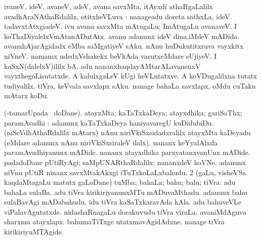 \noindent
\gl{\pagu}
\expl{}
 ivaneV, ideV, avaneV, adeV, avana savxMta, itAyxdi athaRgaLalilx avadhAraNAthaRdalilx, otitxheVLuva \parx :  nanageadu doreta sathxLa, ideV.  tadavxtAtxgiadeV.  ivu avana savxMta mAtugaLu; ImAtugaLu avanaveV.  I koThaDiyalelxVmAtanADutAtx.  avanu adanunx ideV dina,iMdeV mADida.  avanuhAjarAgidadx eMba saMgatiyeV sAku.  nAnu huDukutitxruva vayxkitx niVneV.  namamx udedxVshakekx beVkAda vasutxeMdare sUjiyeV.  I kaSxN(dalelxV)ililx bA.  adu nananxhaqdayAMtarALavanenxV vayxthegoLisutatxde.  A kalulxgaLeV kUgi heVLutatxve.  A koVDugalilxna tutatx tudiyalilx.  tiVra, keVvala savxlapx sAku. nanage bahaLa savxlapx, oMdu cuTaku mAtarx koDu. \eentry

\bentry
{} 
\gl{\kirxvi}
\expl{}
\bmng
\bnum
{} (-tamarUpada \gu\ doDane). 
\banum
{} atayxMta; kaTaTxkaDeya; atayxdhika; gariSaThx; paramAvadhi :  adanunx kaTaTxkaDeya haniyavaregU kuDidubiDu.  (niSeVdhAthaRdalilx mAtarx) nAnu niriVkiSxsidadxralilx atayxMta kaDeyadu (eMdare adanunx nAnu niriVkiSxsiraleV ilalx).  nananx keYyalAlxda paramAvadhiyanunx mADide.  nananx atayxdhika parxyatanxvanUnx mADide. 
  padadoDane pUtiRyAgi; saMpUNARthaRdalilx:  nananxdeV koVNe.  adanunx niVnu pUtiR ninanx savxMtakAkxgi iTuTxkoLaLxbahudu. 
\eanum
\numie
\num{2} (\gu gaLu, visheVSa kaqdaMtagaLu matutx \kirxvi gaLoDane) tuMba; bahaLa; bahu; balu; tiVra:  adu bahaLa sulaBa.  adu tiVra kirikiriyanunxMTu mADuvaMthadu.  adanunx bahu sulaBavAgi mADabahudu.  idu tiVra kaSaTxkaravAda kAla.  adu bahuveVLe viPalavAgutatxde.  nidashaRnagaLu dorakuvudu tiVra viraLa.  avaniMdAguva sharxma atayxlapx.  bahumaTiTxge utatxmavAgidAdxne.  nanage tiVra kirikiriyuMTAgide. 
\enum
\emng

